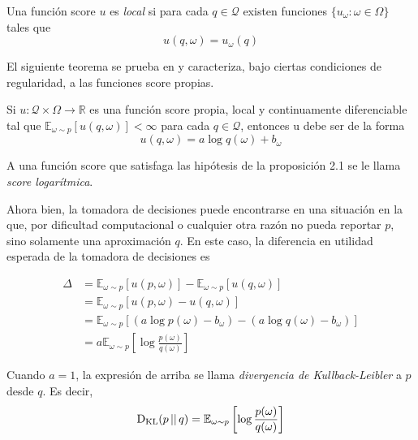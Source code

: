 \documentclass[main.tex]{subfiles}
\begin{document}
\begin{definition}
	Una función score $u$ es \textit{local} si para cada $q \in \mathcal{Q}$
	existen funciones $\{u_\omega: \omega\in\Omega\}$ tales que
	\begin{equation*}
		u(q, \omega) = u_\omega(q)
	\end{equation*}
\end{definition}

El siguiente teorema se prueba en \cite{bernardo} y caracteriza, bajo ciertas
condiciones de regularidad, a las funciones score propias.

\begin{prop}
	Si $u:\mathcal{Q}\times\Omega \to \mathbb{R}$ es una función score propia,
	local y continuamente diferenciable tal que $\mathbb{E}_{\omega \sim
	p}\left[u(q,\omega)\right] < \infty$ para cada $q \in \mathcal{Q}$, entonces
	u debe ser de la forma
	\begin{equation*}
		u(q, \omega) = a\log q(\omega)+b_\omega
	\end{equation*}
\end{prop} 

\begin{definition}
A una función score que satisfaga las hipótesis de la proposición 2.1 se le
llama \textit{score logarítmica}.	
\end{definition}

Ahora bien, la tomadora de decisiones puede encontrarse en una situación en la
que, por dificultad computacional o cualquier otra razón no pueda reportar $p$,
sino solamente una aproximación $q$. En este caso, la diferencia en utilidad
esperada de la tomadora de decisiones es 

\begin{align*}
	\Delta &= \mathbb{E}_{\omega \sim p}\left[u(p, \omega)\right] - 
		\mathbb{E}_{\omega\sim p}\left[u(q, \omega)\right]  \\
	&= \mathbb{E}_{\omega \sim p}\left[u(p, \omega) - u(q, \omega)\right] \\
	&= \mathbb{E}_{\omega \sim p}\left[(a\log p(\omega) - b_\omega) - 
		(a\log q(\omega) - b_\omega) \right] \\
	&= a\mathbb{E}_{\omega \sim p}\left[\log\frac{p(\omega)}{q(\omega)}\right]
\end{align*}

\begin{definition}\label{def:kl-fea}
	Cuando $a=1$, la expresión de arriba se llama \textit{divergencia de
	Kullback-Leibler} a $p$ desde $q$. Es decir, 
	\begin{equation}\label{eqn:kl-fea}
	\operatorname*{D_{KL}}(p \operatorname*{\mid\mid} q) = \mathbb{E}_{\omega \sim p}\left[\log\frac{p(\omega)}{q(\omega)}\right]	
	\end{equation}
\end{definition}
\end{document}
